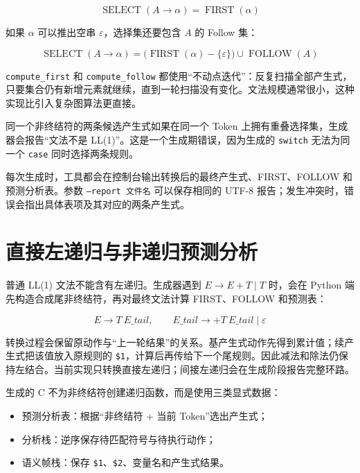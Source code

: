 \begin{equation}
\operatorname{SELECT}(A\rightarrow\alpha)=\operatorname{FIRST}(\alpha)
\end{equation}

如果 $\alpha$ 可以推出空串 $\varepsilon$，选择集还要包含 $A$ 的 Follow 集：

\begin{equation}
\operatorname{SELECT}(A\rightarrow\alpha)=
\bigl(\operatorname{FIRST}(\alpha)-\{\varepsilon\}\bigr)
\cup\operatorname{FOLLOW}(A)
\end{equation}

\texttt{compute\_first} 和 \texttt{compute\_follow} 都使用“不动点迭代”：反复扫描全部产生式，只要集合仍有新增元素就继续，直到一轮扫描没有变化。文法规模通常很小，这种实现比引入复杂图算法更直接。

同一个非终结符的两条候选产生式如果在同一个 Token 上拥有重叠选择集，生成器会报告“文法不是 LL(1)”。这是一个生成期错误，因为生成的 \texttt{switch} 无法为同一个 \texttt{case} 同时选择两条规则。

每次生成时，工具都会在控制台输出转换后的最终产生式、FIRST、FOLLOW 和预测分析表。参数 \texttt{--report 文件名} 可以保存相同的 UTF-8 报告；发生冲突时，错误会指出具体表项及其对应的两条产生式。

\section{直接左递归与非递归预测分析}

普通 LL(1) 文法不能含有左递归。生成器遇到 $E\rightarrow E+T\mid T$ 时，会在 Python 端先构造合成尾非终结符，再对最终文法计算 FIRST、FOLLOW 和预测表：

\begin{equation}
E\rightarrow T\ E\_tail,\qquad
E\_tail\rightarrow +T\ E\_tail\mid\varepsilon
\end{equation}

转换过程会保留原动作与“上一轮结果”的关系。基产生式动作先得到累计值；续产生式把该值放入原规则的 \texttt{\$1}，计算后再传给下一个尾规则。因此减法和除法仍保持左结合。当前实现只转换直接左递归；间接左递归会在生成阶段报告完整环路。

生成的 C 不为非终结符创建递归函数，而是使用三类显式数据：

\begin{itemize}
\item 预测分析表：根据“非终结符 + 当前 Token”选出产生式；
\item 分析栈：逆序保存待匹配符号与待执行动作；
\item 语义帧栈：保存 \texttt{\$1}、\texttt{\$2}、变量名和产生式结果。
\end{itemize}

